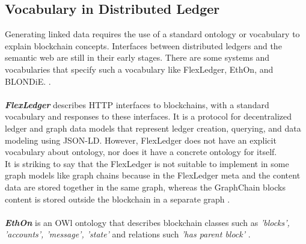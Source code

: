 \subsection{Vocabulary in Distributed Ledger}
Generating linked data requires the use of a standard ontology or vocabulary to explain blockchain concepts. Interfaces between distributed ledgers and the semantic web are still in their early stages. There are some systems and vocabularies that specify such a vocabulary
like FlexLedger, EthOn, and BLONDiE. \cite{Third}.\\
\\
\textbf{\textit{FlexLedger}} describes HTTP interfaces to blockchains, with a standard vocabulary and responses to these interfaces. It is a protocol for decentralized ledger and graph data models that represent ledger creation, querying, and data modeling using JSON-LD. However, FlexLedger does not have an explicit vocabulary about ontology, nor does it have a concrete ontology for itself. \\
It is striking to say that the FlexLedger is not suitable to implement in some graph models like graph chains because in the FlexLedger meta and the content data are stored together in the same graph, whereas the GraphChain blocks content is stored outside the blockchain in a separate graph \cite{Sopek}.\\
\\
\textbf{\textit{EthOn}} is an OWl ontology that describes blockchain classes such as \textit{'blocks', 'accounts', 'message', 'state'} and relations such \textit{'has parent block'} \cite{Rashid}. 
